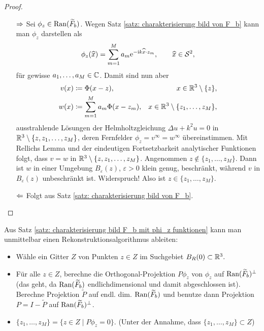 \begin{proof}\
	\begin{enumerate}
		\item[\glqq{}\(\Rightarrow\)\grqq{}] 
		Sei \(\phi_z\in\operatorname{Ran}(\widetilde{F}_b)\). Wegen Satz \ref{satz: charakterisierung bild von F_b} kann man \(\phi_z\) darstellen als
		\begin{equation*}
			\phi_z(\widehat{x})=\sum_{m=1}^Ma_m\mathrm{e}^{-\mathrm{i} k\widehat{x}\cdot z_m},\qquad \widehat{x}\in \mathcal{S}^2,
		\end{equation*}
		für gewisse \(a_1,\ldots,a_M\in\mathbb{C}\). Damit sind nun aber
		\begin{align*}
			v(x) & \coloneqq\Phi(x-z), & x\in\mathbb{R}^3\setminus\{z\},\\
			w(x) & \coloneqq \sum_{m=1}^Ma_m\Phi(x-z_m), & x\in\mathbb{R}^3\setminus\{z_1,\ldots,z_M\},
		\end{align*}
		ausstrahlende Lösungen der Helmholtzgleichung \(\Delta u+k^2u=0\) in \(\mathbb{R}^3\setminus\{z,z_1,\ldots,z_M\}\), deren Fernfelder \(\phi_z=v^\infty=w^\infty\) übereinstimmen. Mit Rellichs Lemma und der eindeutigen Fortsetzbarkeit analytischer Funktionen folgt, dass \(v=w\) in \(\mathbb{R}^3\setminus\{z,z_1,\ldots,z_M\}\). Angenommen \(z\notin\{z_1,\ldots, z_M\}\). Dann ist \(w\) in einer Umgebung \(B_\varepsilon(z)\), \(\varepsilon>0\) klein genug, beschränkt, während \(v\) in \(B_\varepsilon(z)\) unbeschränkt ist. Widerspruch! Also ist \(z\in\{z_1,\ldots,z_M\}\).
		
		\item[\glqq{}\(\Leftarrow\)\grqq{}] Folgt aus Satz \ref{satz: charakterisierung bild von F_b}.
	\end{enumerate}
\end{proof}
Aus Satz \ref{satz: charakterisierung bild F_b mit phi_z funktionen} kann man unmittelbar einen Rekonstruktionsalgorithmus ableiten:
\begin{itemize}
	\item Wähle ein Gitter \(Z\) von Punkten \(z\in Z\) im Suchgebiet \(B_R(0)\subset\mathbb{R}^3.\)
	\item Für alle \(z\in Z\), berechne die Orthogonal-Projektion \(P\phi_z\) von \(\phi_z\) auf \(\operatorname{Ran}(\widetilde{F}_b)^\perp\) (das geht, da \(\operatorname{Ran}(\widetilde{F}_b)\) endlichdimensional und damit abgeschlossen ist). Berechne Projektion \(\widetilde{P}\) auf endl. dim. \(\operatorname{Ran}(\widetilde{F}_b)\) und benutze dann Projektion \(P=I-\widetilde{P}\) auf \(\operatorname{Ran}(\widetilde{F}_b)^\perp\).
	\item \(\{z_1,\ldots, z_M\}=\{z\in Z\mid P\phi_z=0\}\). (Unter der Annahme, dass \(\{z_1,\ldots,z_M\}\subset Z\))
\end{itemize}
